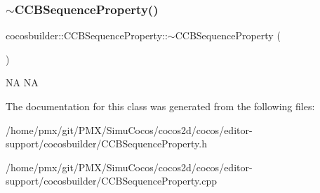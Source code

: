 \subsubsection{\texorpdfstring{$\sim$\+C\+C\+B\+Sequence\+Property()}{~CCBSequenceProperty()}\hspace{0.1cm}{\footnotesize\ttfamily [2/2]}}
{\footnotesize\ttfamily cocosbuilder\+::\+C\+C\+B\+Sequence\+Property\+::$\sim$\+C\+C\+B\+Sequence\+Property (\begin{DoxyParamCaption}{ }\end{DoxyParamCaption})}

NA  NA 

The documentation for this class was generated from the following files\+:\begin{DoxyCompactItemize}
\item 
/home/pmx/git/\+P\+M\+X/\+Simu\+Cocos/cocos2d/cocos/editor-\/support/cocosbuilder/C\+C\+B\+Sequence\+Property.\+h\item 
/home/pmx/git/\+P\+M\+X/\+Simu\+Cocos/cocos2d/cocos/editor-\/support/cocosbuilder/C\+C\+B\+Sequence\+Property.\+cpp\end{DoxyCompactItemize}
